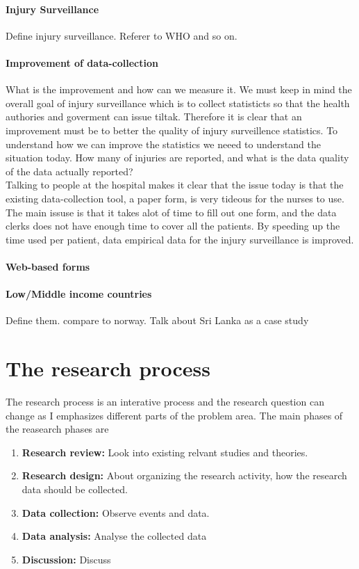 \documentclass[UKenglish, 12pt]{article}
\begin{document}
\paragraph*{Injury Surveillance}
Define injury surveillance. Referer to WHO and so on.

\paragraph*{Improvement of data-collection} 
What is the improvement and how can  we measure it. We must keep in mind the overall goal of injury surveillance which is to collect statisticts so that the health authories and goverment can issue tiltak. Therefore it is clear that an improvement must be to better the quality of injury surveillence statistics. To understand how we can improve the statistics we neeed to understand the situation today. How many of injuries are reported, and what is the data quality of the data actually reported? \\
Talking to people at the hospital makes it clear that the issue today is that the existing data-collection tool, a paper form, is very tideous for the nurses to use. The main issuse is that it takes alot of time to fill out one form, and the data clerks does not have enough time to cover all the patients. By speeding up the time used per patient, data empirical data for the injury surveillance is improved.

\paragraph*{Web-based forms}

\paragraph*{Low/Middle income countries}
Define them. compare to norway. Talk about Sri Lanka as a case study
 

 \section*{The research process}
 The research process is an interative process and the research question can change as I emphasizes different parts of the problem area. The main phases of the reasearch phases are
 \begin{enumerate}
 \item \textbf{Research review:} Look into existing relvant studies and theories.
 \item \textbf{Research design:} About organizing the research activity, how the research data should be collected.
 \item \textbf{Data collection:} Observe events and data.
 \item \textbf{Data analysis:} Analyse the collected data
 \item \textbf{Discussion:} Discuss

 \end{enumerate}
\end{document}

